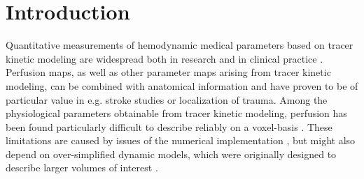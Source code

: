 \documentclass[aps,prb,article,groupedaddress,showkeys]{revtex4}
\begin{document}
\maketitle

\linenumbers\modulolinenumbers[5]

\section{Introduction}
	Quantitative measurements of hemodynamic medical parameters based on tracer kinetic modeling are widespread both in research and in clinical practice \cite{sourbron13,Feng2013,Chen2011}. 
	Perfusion maps, as well as other parameter maps arising from tracer kinetic modeling, can be combined with anatomical information and have proven to be of particular value in e.g. stroke studies or localization of trauma.
	Among the physiological parameters obtainable from tracer kinetic modeling, perfusion has been found particularly difficult to describe reliably on a voxel-basis \cite{kudo10}.
	These limitations are caused by issues of the numerical implementation \cite{kudo10}, but might also depend on over-simplified dynamic models, which were originally designed to describe larger volumes of interest \cite{zierler00}.	
	
\end{document}
